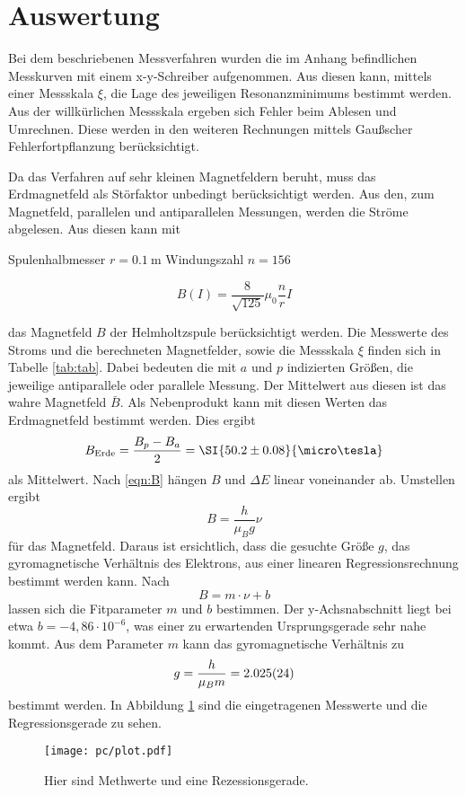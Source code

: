 \section{Auswertung}
\label{sec:Auswertung}
Bei dem beschriebenen Messverfahren wurden die im Anhang befindlichen Messkurven mit einem x-y-Schreiber aufgenommen.
Aus diesen kann, mittels einer Messskala $\xi$, die Lage des jeweiligen Resonanzminimums bestimmt werden. Aus der willkürlichen Messskala ergeben sich Fehler beim Ablesen und Umrechnen. Diese werden in den weiteren Rechnungen mittels Gaußscher Fehlerfortpflanzung berücksichtigt.



Da das Verfahren auf sehr kleinen Magnetfeldern beruht, muss das Erdmagnetfeld als Störfaktor unbedingt berücksichtigt werden. Aus den, zum Magnetfeld, parallelen und antiparallelen Messungen, werden die Ströme abgelesen. Aus diesen kann mit

Spulenhalbmesser $r = \SI{0.1}{\meter}$
Windungszahl $n = 156$

\begin{equation}
    B(I)= \frac{8}{\sqrt{125}}\mu_0\frac{n}{r}I
\end{equation}

das Magnetfeld $B$ der Helmholtzspule berücksichtigt werden.
Die Messwerte des Stroms und die berechneten Magnetfelder, sowie die Messskala $\xi$ finden sich in Tabelle \ref{tab:tab}.
Dabei bedeuten die mit $a$ und $p$ indizierten Größen, die jeweilige antiparallele oder parallele Messung. Der Mittelwert aus diesen ist das wahre Magnetfeld $\bar B$. 
Als Nebenprodukt kann mit diesen Werten das Erdmagnetfeld bestimmt werden.
Dies ergibt
\begin{equation}
	B_\text{Erde} = \frac{B_p - B_a}{2} = \SI{50.2\pm 0.08}{\micro\tesla}
\end{equation}
als Mittelwert.
Nach \eqref{eqn:B} hängen $B$ und $\Delta E$ linear voneinander ab.
Umstellen ergibt
\begin{equation}
	B = \frac{h}{\mu_B g} \nu
\end{equation}
für das Magnetfeld.
Daraus ist ersichtlich, dass die gesuchte Größe $g$, das gyromagnetische Verhältnis des Elektrons, aus einer linearen Regressionsrechnung bestimmt werden kann.
Nach
\begin{equation}
	B = m\cdot\nu + b
\end{equation}
lassen sich die Fitparameter $m$ und $b$ bestimmen. Der y-Achsnabschnitt liegt bei etwa $b = -4{,}86\cdot10^{-6}$, was einer zu erwartenden Ursprungsgerade sehr nahe kommt.
Aus dem Parameter $m$ kann das gyromagnetische Verhältnis zu
\begin{equation}
	g = \frac{h}{\mu_B m} = \SI{2.025\pm0.024}{}
\end{equation} 
bestimmt werden.
In Abbildung \ref{fig:plot} sind die eingetragenen Messwerte und die Regressionsgerade zu sehen.



\begin{figure}
	\centering
	\texttt{[image: pc/plot.pdf]}
	\caption{Hier sind Methwerte und eine Rezessionsgerade.}
	\label{fig:plot}
\end{figure}
